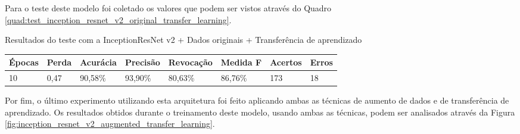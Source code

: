 \documentclass[
	12pt,				%
	oneside,			%
	a4paper,			%
	english,			%
	brazil				%
	]{abntex2ppgsi}
\begin{document}
Para o teste deste modelo foi coletado os valores que podem ser vistos através do Quadro \ref{quad:test_inception_resnet_v2_original_transfer_learning}.

\begin{quadro}[H]
\caption{Resultados do teste com a InceptionResNet v2 + Dados originais + Transferência de aprendizado}
\label{quad:test_inception_resnet_v2_original_transfer_learning}
\centering
\begin{tabular}{|l|l|l|l|l|l|l|l|}
\cline{1-8}
Épocas & Perda & Acurácia & Precisão & Revocação & Medida F & Acertos & Erros \\ \hline
10 & 0,47 & 90,58\% & 93,90\% & 80,63\% & 86,76\% & 173 & 18 \\
\cline{1-8}
\end{tabular}
\end{quadro}

Por fim, o último experimento utilizando esta arquitetura foi feito aplicando ambas as técnicas de aumento de dados e de transferência de aprendizado. Os resultados obtidos durante o treinamento deste modelo, usando ambas as técnicas, podem ser analisados através da Figura \ref{fig:inception_resnet_v2_augmented_transfer_learning}.
\end{document}
